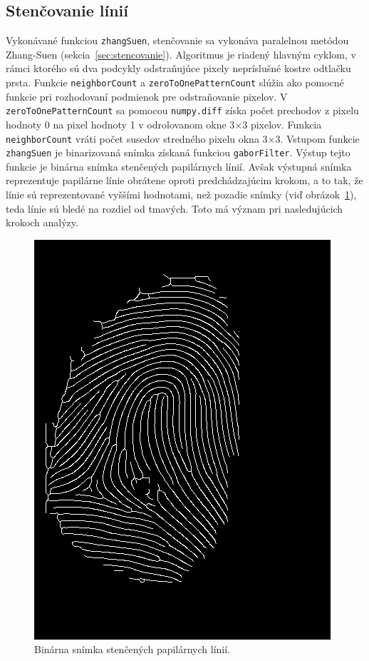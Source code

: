   \subsection{Stenčovanie línií}
  Vykonávané funkciou \texttt{zhangSuen}, stenčovanie sa vykonáva paralelnou metódou Zhang-Suen (sekcia~{\ref{sec:stencovanie}}). Algoritmus je riadený
  hlavným cyklom, v rámci ktorého sú
  dva podcykly odstraňujúce pixely nepríslušné kostre odtlačku prsta. Funkcie \texttt{neighborCount} a \texttt{zeroToOnePatternCount} slúžia ako pomocné
  funkcie pri rozhodovaní podmienok pre odstraňovanie pixelov. V \texttt{zeroToOnePatternCount} sa pomocou \texttt{numpy.diff} získa počet prechodov
  z pixelu hodnoty 0 na pixel hodnoty 1 v odrolovanom okne $3$$\times{}$$3$ pixelov. Funkcia \texttt{neighborCount} vráti počet susedov stredného pixelu okna
  $3$$\times{}$$3$. Vstupom funkcie \texttt{zhangSuen} je binarizovaná snímka získaná funkciou \texttt{gaborFilter}.
  Výstup tejto funkcie je binárna snímka stenčených papilárnych línií. Avšak výstupná snímka reprezentuje papilárne línie obrátene oproti predchádzajúcim
  krokom, a to tak, že línie sú reprezentované vyššími hodnotami, než pozadie snímky (viď obrázok~{\ref{obr:stencene}}), teda línie sú bledé na rozdiel od
  tmavých. Toto má význam pri nasledujúcich krokoch analýzy.

  \begin{figure}[h]
    \centering
    \includegraphics[width=0.3\linewidth]{obrazky-figures/thinned.png}
    \caption{Binárna snímka stenčených papilárnych línií.}
    \label{obr:stencene}
  \end{figure}

